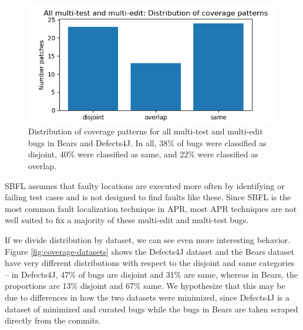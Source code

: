 \begin{figure}
	\includegraphics[width=\linewidth]{img/coverage-all.png}
	\caption{Distribution of coverage patterns for all multi-test and 
	multi-edit bugs in Bears and Defects4J. In all, 38\% of bugs were classified as disjoint, 40\% were 
	classified as same, and 22\% were classified as overlap.}
	\label{fig:coverage-all}
\end{figure}

SBFL assumes that faulty locations are executed more often by identifying 
or failing test cases and is not designed to find faults like these. Since SBFL 
is the most common fault localization technique in APR, most APR techniques 
are not well suited to fix a majority of these multi-edit and multi-test 
bugs.

If we divide distribution by dataset, we can see even more interesting 
behavior. Figure \ref{fig:coverage-datasets} shows the Defects4J dataset and 
the Bears dataset have very different distributions with respect to the 
disjoint and same categories -- in Defects4J, 47\% of bugs are disjoint and 
31\% are same, whereas in Bears, the proportions are 13\% disjoint and 67\% 
same. We hypothesize that this may be due to differences in how the two 
datasets were minimized, since Defects4J is a dataset of minimized and curated 
bugs while the bugs in Bears are taken scraped directly from the commits.


